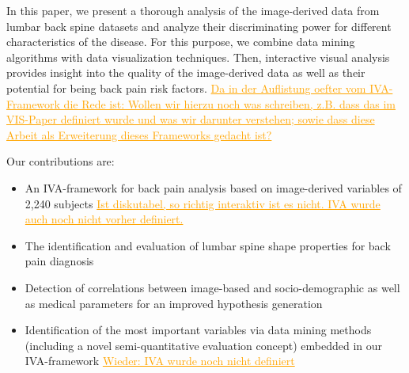 \documentclass[a4paper,twoside]{style/article}
\newcommand{\com}[1]{\textcolor{orange}{\uline{#1}}}
\begin{document}
In this paper, we present a thorough analysis of the image-derived data from lumbar back spine datasets and analyze their discriminating power for different characteristics of the disease.
For this purpose, we combine data mining algorithms with data visualization techniques.
Then, interactive visual analysis provides insight into the quality of the image-derived data as well as their potential for being back pain risk factors.
\com{Da in der Auflistung oefter vom IVA-Framework die Rede ist: Wollen wir hierzu noch was schreiben, z.B. dass das im VIS-Paper definiert wurde und was wir darunter verstehen; sowie dass diese Arbeit als Erweiterung dieses Frameworks gedacht ist?}

Our contributions are:
\begin{itemize}
\item An IVA-framework for back pain analysis based on image-derived variables of 2,240 subjects \com{Ist diskutabel, so richtig interaktiv ist es nicht. IVA wurde auch noch nicht vorher definiert.}
\item The identification and evaluation of lumbar spine shape properties for back pain diagnosis
\item Detection of correlations between image-based and socio-demographic as well as medical parameters for an improved hypothesis generation
\item Identification of the most important variables via data mining methods (including a novel semi-quantitative evaluation concept) embedded in our IVA-framework \com{Wieder: IVA wurde noch nicht definiert}
\end{itemize}
\end{document}
